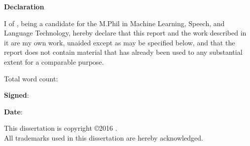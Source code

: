 \documentclass[dissertation.tex]{subfiles}
\begin{document}
\newpage
{\Huge \bf Declaration}

\vspace{24pt}

I \authorname of \authorcollege, being a candidate for the M.Phil in Machine
Learning, Speech, and Language Technology, hereby declare that this report and
the work described in it are my own work, unaided except as may be specified
below, and that the report does not contain material that has already been used
to any substantial extent for a comparable purpose.

\vspace{24pt}
Total word count: \wordcount

\vspace{60pt}
\textbf{Signed}:

\vspace{12pt}
\textbf{Date}:


\vfill

This dissertation is copyright \copyright 2016 \authorname.
\\
All trademarks used in this dissertation are hereby acknowledged.



\newpage
\vspace*{\fill}
\end{document}
